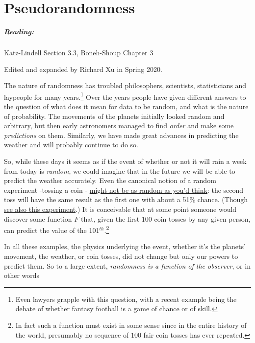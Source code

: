 \chapter{Pseudorandomness}\label{Pseudorandomness}

\paragraph{Reading:} Katz-Lindell Section 3.3, Boneh-Shoup Chapter 3

Edited and expanded by Richard Xu in Spring 2020.

The nature of randomness has troubled philosophers, scientists,
statisticians and laypeople for many years.\footnote{Even lawyers
  grapple with this question, with a recent example being the debate of
  whether fantasy football is a game of chance or of skill.} Over the
years people have given different answers to the question of what does
it mean for data to be random, and what is the nature of probability.
The movements of the planets initially looked random and arbitrary, but
then early astronomers managed to find \emph{order} and make some
\emph{predictions} on them. Similarly, we have made great advances in
predicting the weather and will probably continue to do so.

So, while these days it seems as if the event of whether or not it will
rain a week from today is \emph{random}, we could imagine that in the
future we will be able to predict the weather accurately. Even the
canonical notion of a random experiment -tossing a coin -
\href{http://statweb.stanford.edu/~susan/papers/headswithJ.pdf}{might
not be as random as you'd think}: the second toss will have the same
result as the first one with about a 51\% chance. (Though
\href{https://www.stat.berkeley.edu/~aldous/Real-World/coin_tosses.html}{see
also this experiment}.) It is conceivable that at some point someone
would discover some function \(F\) that, given the first 100 coin tosses
by any given person, can predict the value of the
101\(^{th}\).\footnote{In fact such a function must exist in some sense
  since in the entire history of the world, presumably no sequence of
  \(100\) fair coin tosses has ever repeated.}

In all these examples, the physics underlying the event, whether it's
the planets' movement, the weather, or coin tosses, did not change but
only our powers to predict them. So to a large extent, \emph{randomness
is a function of the observer}, or in other words

